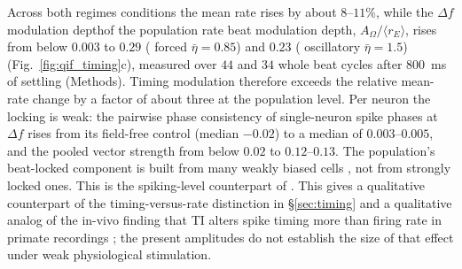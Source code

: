 \documentclass[11pt,a4paper]{article}
\providecommand{\DIFaddtex}[1]{{\protect\color{blue} \sf #1}} %
\providecommand{\DIFdeltex}[1]{{\protect\color{red} \scriptsize #1}} %
\providecommand{\DIFaddbegin}{} %
\providecommand{\DIFaddend}{} %
\providecommand{\DIFdelbegin}{} %
\providecommand{\DIFdelend}{} %
\providecommand{\DIFadd}[1]{\texorpdfstring{\DIFaddtex{#1}}{#1}} %
\providecommand{\DIFdel}[1]{\texorpdfstring{\DIFdeltex{#1}}{}} %
\begin{document}
Across both \DIFdelbegin \DIFdel{regimes }\DIFdelend \DIFaddbegin \DIFadd{conditions }\DIFaddend the mean rate rises by about $8$--$11\%$, while the \DIFdelbegin \DIFdel{$\Delta f$ modulation
depthof the
population rate}\DIFdelend \DIFaddbegin \DIFadd{beat modulation
depth}\DIFaddend , $A_\Omega/\langle r_E\rangle$, rises from below $0.003$ to $0.29$
(\DIFdelbegin \DIFdel{forced}\DIFdelend \DIFaddbegin \DIFadd{$\bar\eta=0.85$}\DIFaddend ) and $0.23$ (\DIFdelbegin \DIFdel{oscillatory}\DIFdelend \DIFaddbegin \DIFadd{$\bar\eta=1.5$}\DIFaddend ) (Fig.~\ref{fig:qif_timing}c), measured over $44$ and $34$ whole beat
cycles after $800$~ms of settling (Methods). Timing modulation therefore exceeds the
relative mean-rate change by a factor of about three at the population level. Per neuron
the locking is weak: the pairwise phase consistency of single-neuron spike phases at
$\Delta f$ rises from its field-free control (median $-0.02$) to a median of
$0.003$--$0.005$, and the pooled vector strength from below $0.02$ to $0.12$--$0.13$. The
population's beat-locked component is built from many weakly biased cells\DIFdelbegin \DIFdel{, not from
strongly locked ones. This is the spiking-level counterpart of }\DIFdelend \DIFaddbegin \DIFadd{. This gives a
qualitative counterpart of the timing-versus-rate distinction in }\DIFaddend \S\ref{sec:timing}
and \DIFdelbegin \DIFdel{a
qualitative analog of the in-vivo finding that TI alters spike timing more than firing
rate \cite{vieira2024}}\DIFdelend \DIFaddbegin \DIFadd{in primate recordings \cite{vieira2024}; the present amplitudes do not establish
the size of that effect under weak physiological stimulation}\DIFaddend .
\end{document}
